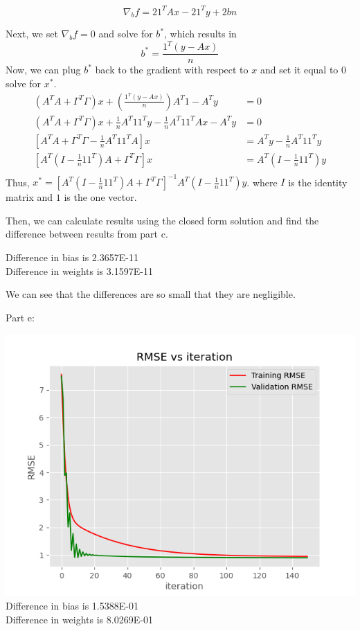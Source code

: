 \documentclass[12pt,letterpaper]{hmcpset}
\begin{document}
\begin{solution}
\[
\nabla_b f = 2 1^T Ax - 2 1^T y + 2bn 
\]

Next, we set $\nabla_b f = 0$ and solve for $b^*$, which results in
\[
b^* = \frac{1^T (y - Ax)}{n}
\]
Now, we can plug \( b^* \) back to the gradient with respect to $x$ and set it equal to $0$ solve for \( x^* \).
\begin{align*}
	(A^T A + \Gamma^T \Gamma)x + \left( \frac{1^T (y - Ax)}{n} \right) A^T 1 - A^T y &= 0\\
(A^T A + \Gamma^T \Gamma)x + \frac{1}{n} A^T 11^T y - \frac{1}{n} A^T 11^T Ax - A^T y &= 0\\
\left[ A^T A + \Gamma^T \Gamma - \frac{1}{n} A^T 11^T A \right] x &= A^T y - \frac{1}{n} A^T 11^T y\\
\left[ A^T \left( I - \frac{1}{n} 11^T \right) A + \Gamma^T \Gamma \right] x &= A^T \left( I - \frac{1}{n} 11^T \right) y\\
\end{align*}
Thus, $x^* = \left[ A^T \left( I - \frac{1}{n} 11^T \right) A + \Gamma^T \Gamma \right]^{-1} A^T \left( I - \frac{1}{n} 11^T \right) y$.
where \( I \) is the identity matrix and \( 1 \) is the one vector.

Then, we can calculate results using the closed form solution and find the difference between results from part c.

Difference in bias is  2.3657E-11\\
Difference in weights is  3.1597E-11

We can see that the differences are so small that they are negligible.

\newpage
Part e:

\includegraphics{convergence.png}
Difference in bias is  1.5388E-01\\
Difference in weights is  8.0269E-01
\end{solution}
\newpage
\end{document}
